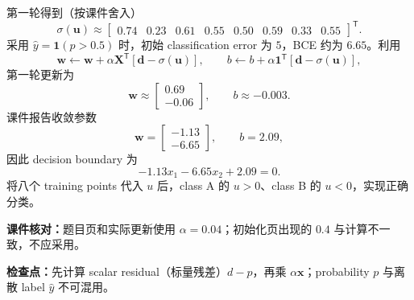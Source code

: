 \begin{checkedsolution}
第一轮得到（按课件舍入）
\[
  \sigma(\bm u)\approx
  \begin{bmatrix}0.74&0.23&0.61&0.55&0.50&0.59&0.33&0.55\end{bmatrix}^{\mathsf T}.
\]
采用 $\hat y=\mathbf 1(p>0.5)$ 时，初始 classification error 为 $5$，BCE 约为 $6.65$。利用
\[
  \bm w\leftarrow\bm w+\alpha\bm X^{\mathsf T}[\bm d-\sigma(\bm u)],
  \qquad
  b\leftarrow b+\alpha\bm 1^{\mathsf T}[\bm d-\sigma(\bm u)],
\]
第一轮更新为
\[
  \bm w\approx
  \begin{bmatrix}0.69\\-0.06\end{bmatrix},
  \qquad b\approx-0.003.
\]
课件报告收敛参数
\[
  \bm w=
  \begin{bmatrix}-1.13\\-6.65\end{bmatrix},
  \qquad b=2.09,
\]
因此 decision boundary 为
\[
  \boxed{-1.13x_1-6.65x_2+2.09=0}.
\]
将八个 training points 代入 $u$ 后，class A 的 $u>0$、class B 的 $u<0$，实现正确分类。

\textbf{课件核对：}题目页和实际更新使用 $\alpha=0.04$；初始化页出现的 $0.4$ 与计算不一致，不应采用。
\end{checkedsolution}

\textbf{检查点：}先计算 scalar residual（标量残差）$d-p$，再乘 $\alpha\bm x$；probability $p$ 与离散 label $\hat y$ 不可混用。
